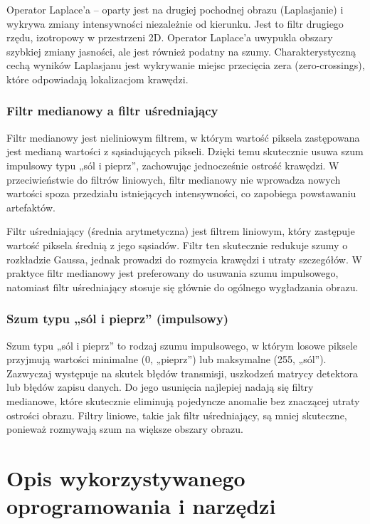 Operator Laplace’a – oparty jest na drugiej pochodnej obrazu (Laplasjanie) i wykrywa zmiany intensywności niezależnie od kierunku. Jest to filtr drugiego rzędu, izotropowy w przestrzeni 2D. Operator Laplace’a uwypukla obszary szybkiej zmiany jasności, ale jest również podatny na szumy. Charakterystyczną cechą wyników Laplasjanu jest wykrywanie miejsc przecięcia zera (zero-crossings), które odpowiadają lokalizacjom krawędzi.

\subsubsection{Filtr medianowy a filtr uśredniający}

Filtr medianowy jest nieliniowym filtrem, w którym wartość piksela zastępowana jest medianą wartości z sąsiadujących pikseli. Dzięki temu skutecznie usuwa szum impulsowy typu „sól i pieprz”, zachowując jednocześnie ostrość krawędzi. W przeciwieństwie do filtrów liniowych, filtr medianowy nie wprowadza nowych wartości spoza przedziału istniejących intensywności, co zapobiega powstawaniu artefaktów.

Filtr uśredniający (średnia arytmetyczna) jest filtrem liniowym, który zastępuje wartość piksela średnią z jego sąsiadów. Filtr ten skutecznie redukuje szumy o rozkładzie Gaussa, jednak prowadzi do rozmycia krawędzi i utraty szczegółów. W praktyce filtr medianowy jest preferowany do usuwania szumu impulsowego, natomiast filtr uśredniający stosuje się głównie do ogólnego wygładzania obrazu.

\subsubsection{Szum typu „sól i pieprz” (impulsowy)}

Szum typu „sól i pieprz” to rodzaj szumu impulsowego, w którym losowe piksele przyjmują wartości minimalne (0, „pieprz”) lub maksymalne (255, „sól”). Zazwyczaj występuje na skutek błędów transmisji, uszkodzeń matrycy detektora lub błędów zapisu danych. Do jego usunięcia najlepiej nadają się filtry medianowe, które skutecznie eliminują pojedyncze anomalie bez znaczącej utraty ostrości obrazu. Filtry liniowe, takie jak filtr uśredniający, są mniej skuteczne, ponieważ rozmywają szum na większe obszary obrazu.

\section{Opis wykorzystywanego oprogramowania i narzędzi}

